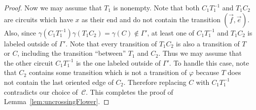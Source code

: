 \documentclass[10pt,a4paper]{amsart}
\newcommand{\C}{\mathcal{C}}
\begin{document}
\begin{proof}
    Now we may assume that $T_1$ is nonempty. Note that both $C_1 T_1^{-1}$ and $T_1 C_2$ are circuits which have $x$ as their end and do not contain the transition $(\vec{f}, \vec{e})$. Also, since $\gamma(C_1 T_1^{-1})\gamma(T_1 C_2) = \gamma(C) \not\in\Gamma'$, at least one of $C_1 T_1^{-1}$ and $T_1 C_2$ is labeled outside of $\Gamma'$. Note that every transition of $T_1 C_2$ is also a transition of $T$ or $C$, including the transition ``between'' $T_1$ and $C_2$. Thus we may assume that the other circuit $C_1 T_1^{-1}$ is the one labeled outside of $\Gamma'$. To handle this case, note that $C_2$ contains some transition which is not a transition of $\varphi$ because $T$ does not contain the last oriented edge of $C_2$. Therefore replacing $C$ with $C_1 T_1^{-1}$ contradicts our choice of~$\C$. This completes the proof of Lemma~\ref{lem:uncrossingFlower}.

\end{proof}
\end{document}
